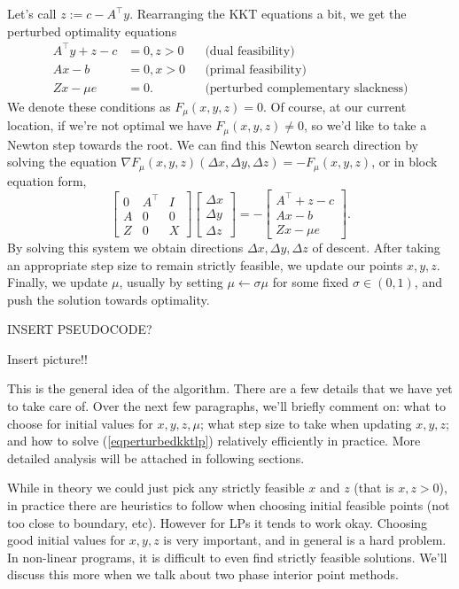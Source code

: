 \documentclass[11pt]{article}
\numberwithin{equation}{section}
\theoremstyle{definition}
\begin{document}
Let's call $z:=c-A^\top y$. Rearranging the KKT equations a bit, we get the perturbed optimality equations
\begin{align}
        A^\top y+z-c&=0, z>0 &&\text{(dual feasibility)}\\
        Ax-b&=0, x>0 && \text{(primal feasibility)}\\
        Zx-\mu e&=0. && \text{(perturbed complementary slackness)}
\end{align}
We denote these conditions as $F_\mu(x,y,z)=0$. Of course, at our current location, if we're not optimal we have $F_\mu(x,y,z)\neq 0$, so we'd like to take a Newton step towards the root. We can find this Newton search direction by solving the equation $\nabla F_\mu(x,y,z)(\Delta x, \Delta y, \Delta z)=-F_\mu(x,y,z)$, or in block equation form,
\begin{equation}
    \label{eqperturbedkktlp}
    \begin{bmatrix}
     0&A^\top&I\\A&0&0\\Z&0&X
    \end{bmatrix}
    \begin{bmatrix}
        \Delta x\\\Delta y\\\Delta z
    \end{bmatrix}
    =-\begin{bmatrix}
        A^\top+z-c\\Ax-b\\Zx-\mu e
    \end{bmatrix}.
\end{equation}
By solving this system we obtain directions $\Delta x, \Delta y, \Delta z$ of descent. After taking an appropriate step size to remain strictly feasible, we update our points $x, y, z$. Finally, we update $\mu$, usually by setting $\mu\gets\sigma\mu$ for some fixed $\sigma\in(0,1)$, and push the solution towards optimality.

INSERT PSEUDOCODE?

Insert picture!!

This is the general idea of the algorithm. There are a few details that we have yet to take care of. Over the next few paragraphs, we'll briefly comment on: what to choose for initial values for $x, y, z, \mu$; what step size to take when updating $x, y, z$; and how to solve (\ref{eqperturbedkktlp}) relatively efficiently in practice. More detailed analysis will be attached in following sections.

While in theory we could just pick any strictly feasible $x$ and $z$ (that is $x, z>0$), in practice there are heuristics to follow when choosing initial feasible points (not too close to boundary, etc). However for LPs it tends to work okay. Choosing good initial values for $x, y, z$ is very important, and in general is a hard problem. In non-linear programs, it is difficult to even find strictly feasible solutions. We'll discuss this more when we talk about two phase interior point methods.
\end{document}
